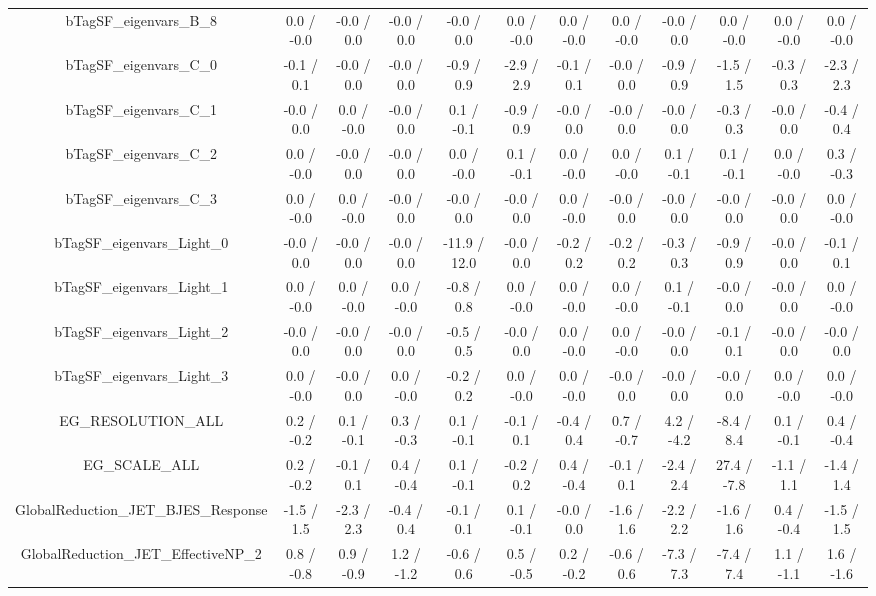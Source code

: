 \begin{table}[htbp]
\begin{center}
\begin{tabular}{|c|c|c|c|c|c|c|c|c|c|c|c|}
  bTagSF_eigenvars_B_8 & 0.0 / -0.0 & -0.0 / 0.0 & -0.0 / 0.0 & -0.0 / 0.0 & 0.0 / -0.0 & 0.0 / -0.0 & 0.0 / -0.0 & -0.0 / 0.0 & 0.0 / -0.0 & 0.0 / -0.0 & 0.0 / -0.0 \\ 
  bTagSF_eigenvars_C_0 & -0.1 / 0.1 & -0.0 / 0.0 & -0.0 / 0.0 & -0.9 / 0.9 & -2.9 / 2.9 & -0.1 / 0.1 & -0.0 / 0.0 & -0.9 / 0.9 & -1.5 / 1.5 & -0.3 / 0.3 & -2.3 / 2.3 \\ 
  bTagSF_eigenvars_C_1 & -0.0 / 0.0 & 0.0 / -0.0 & -0.0 / 0.0 & 0.1 / -0.1 & -0.9 / 0.9 & -0.0 / 0.0 & -0.0 / 0.0 & -0.0 / 0.0 & -0.3 / 0.3 & -0.0 / 0.0 & -0.4 / 0.4 \\ 
  bTagSF_eigenvars_C_2 & 0.0 / -0.0 & -0.0 / 0.0 & -0.0 / 0.0 & 0.0 / -0.0 & 0.1 / -0.1 & 0.0 / -0.0 & 0.0 / -0.0 & 0.1 / -0.1 & 0.1 / -0.1 & 0.0 / -0.0 & 0.3 / -0.3 \\ 
  bTagSF_eigenvars_C_3 & 0.0 / -0.0 & 0.0 / -0.0 & -0.0 / 0.0 & -0.0 / 0.0 & -0.0 / 0.0 & 0.0 / -0.0 & -0.0 / 0.0 & -0.0 / 0.0 & -0.0 / 0.0 & -0.0 / 0.0 & 0.0 / -0.0 \\ 
  bTagSF_eigenvars_Light_0 & -0.0 / 0.0 & -0.0 / 0.0 & -0.0 / 0.0 & -11.9 / 12.0 & -0.0 / 0.0 & -0.2 / 0.2 & -0.2 / 0.2 & -0.3 / 0.3 & -0.9 / 0.9 & -0.0 / 0.0 & -0.1 / 0.1 \\ 
  bTagSF_eigenvars_Light_1 & 0.0 / -0.0 & 0.0 / -0.0 & 0.0 / -0.0 & -0.8 / 0.8 & 0.0 / -0.0 & 0.0 / -0.0 & 0.0 / -0.0 & 0.1 / -0.1 & -0.0 / 0.0 & -0.0 / 0.0 & 0.0 / -0.0 \\ 
  bTagSF_eigenvars_Light_2 & -0.0 / 0.0 & -0.0 / 0.0 & -0.0 / 0.0 & -0.5 / 0.5 & -0.0 / 0.0 & 0.0 / -0.0 & 0.0 / -0.0 & -0.0 / 0.0 & -0.1 / 0.1 & -0.0 / 0.0 & -0.0 / 0.0 \\ 
  bTagSF_eigenvars_Light_3 & 0.0 / -0.0 & -0.0 / 0.0 & 0.0 / -0.0 & -0.2 / 0.2 & 0.0 / -0.0 & 0.0 / -0.0 & -0.0 / 0.0 & -0.0 / 0.0 & -0.0 / 0.0 & 0.0 / -0.0 & 0.0 / -0.0 \\ 
  EG_RESOLUTION_ALL & 0.2 / -0.2 & 0.1 / -0.1 & 0.3 / -0.3 & 0.1 / -0.1 & -0.1 / 0.1 & -0.4 / 0.4 & 0.7 / -0.7 & 4.2 / -4.2 & -8.4 / 8.4 & 0.1 / -0.1 & 0.4 / -0.4 \\ 
  EG_SCALE_ALL & 0.2 / -0.2 & -0.1 / 0.1 & 0.4 / -0.4 & 0.1 / -0.1 & -0.2 / 0.2 & 0.4 / -0.4 & -0.1 / 0.1 & -2.4 / 2.4 & 27.4 / -7.8 & -1.1 / 1.1 & -1.4 / 1.4 \\ 
  GlobalReduction_JET_BJES_Response & -1.5 / 1.5 & -2.3 / 2.3 & -0.4 / 0.4 & -0.1 / 0.1 & 0.1 / -0.1 & -0.0 / 0.0 & -1.6 / 1.6 & -2.2 / 2.2 & -1.6 / 1.6 & 0.4 / -0.4 & -1.5 / 1.5 \\ 
  GlobalReduction_JET_EffectiveNP_2 & 0.8 / -0.8 & 0.9 / -0.9 & 1.2 / -1.2 & -0.6 / 0.6 & 0.5 / -0.5 & 0.2 / -0.2 & -0.6 / 0.6 & -7.3 / 7.3 & -7.4 / 7.4 & 1.1 / -1.1 & 1.6 / -1.6 \\ 

\end{tabular}
\end{center}
\end{table}

